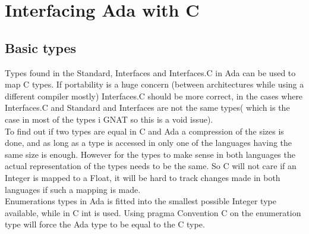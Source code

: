\chapter{Interfacing Ada with C}
\section{Basic types}
Types found in the Standard, Interfaces and Interfaces.C in Ada can be used to map C types. If portability is a huge concern (between architectures while using a different compiler mostly) Interfaces.C should be more correct, in the cases where Interfaces.C and Standard and Interfaces are not the same types( which is the case in most of the types i GNAT so this is a void issue).
\\
To find out if two types are equal in C and Ada a compression of the sizes is done, and as long as a type is accessed in only one of the languages having the same size is enough. However for the types to make sense in both languages the actual representation of the types needs to be the same. So C will not care if an Integer is mapped to a Float, it will be hard to track changes made in both languages if such a mapping is made.
\\
Enumerations types in Ada is fitted into the smallest possible Integer type available, while in C int is used. Using pragma Convention C on the enumeration type will force the Ada type to be equal to the C type.
